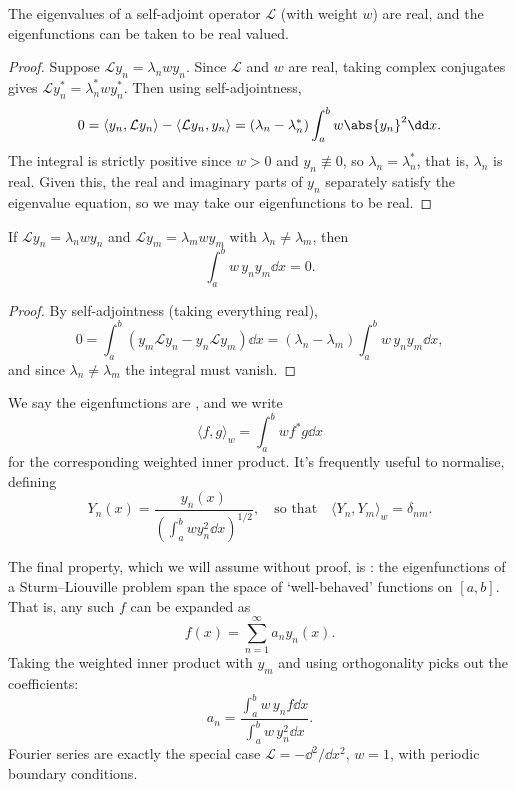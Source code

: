 \begin{proposition}
    The eigenvalues of a self-adjoint operator $\mathcal{L}$ (with weight $w$) are real, and the eigenfunctions can be taken to be real valued.
\end{proposition}
\begin{proof}
    Suppose $\mathcal{L} y_n = \lambda_n w y_n$. Since $\mathcal{L}$ and $w$ are real, taking complex conjugates gives $\mathcal{L} y_n^* = \lambda_n^* w y_n^*$.
    Then using self-adjointness,
    $$
    0 = \langle y_n , \mathcal{L} y_n \rangle - \langle \mathcal{L} y_n, y_n \rangle = (\lambda_n - \lambda_n^*)\int_a^b w \abs{y_n}^2 \dd x.
    $$
    The integral is strictly positive since $w > 0$ and $y_n \not\equiv 0$, so $\lambda_n = \lambda_n^*$, that is, $\lambda_n$ is real.
    Given this, the real and imaginary parts of $y_n$ separately satisfy the eigenvalue equation, so we may take our eigenfunctions to be real.
\end{proof}

\begin{proposition}
    If $\mathcal{L} y_n = \lambda_n w y_n$ and $\mathcal{L}y_m = \lambda_m w y_m$ with $\lambda_n \neq \lambda_m$, then
    $$
    \int_a^b w\, y_n y_m \dd x = 0.
    $$
\end{proposition}
\begin{proof}
    By self-adjointness (taking everything real),
    $$
    0 = \int_a^b \left(y_m \mathcal{L} y_n - y_n \mathcal{L}y_m\right) \dd x = (\lambda_n - \lambda_m) \int_a^b w \, y_n y_m \dd x,
    $$
    and since $\lambda_n \neq \lambda_m$ the integral must vanish.
\end{proof}

We say the eigenfunctions are , and we write
$$
\langle f, g \rangle_w = \int_a^b w f^* g \dd x
$$
for the corresponding weighted inner product. It's frequently useful to normalise, defining
$$
Y_n(x) = \frac{y_n(x)}{\left(\int_a^b w y_n^2 \dd x\right)^{1/2}}, \quad \text{so that} \quad \langle Y_n, Y_m \rangle_w = \delta_{nm}.
$$

The final property, which we will assume without proof, is : the eigenfunctions of a Sturm--Liouville problem span the space of `well-behaved' functions on $[a, b]$. That is, any such $f$ can be expanded as
$$
f(x) = \sum_{n = 1}^{\infty} a_n y_n(x).
$$
Taking the weighted inner product with $y_m$ and using orthogonality picks out the coefficients:
$$
a_n = \frac{\int_a^b w\, y_n f \dd x}{\int_a^b w \,y_n^2 \dd x}.
$$
Fourier series are exactly the special case $\mathcal{L} = -\dd^2/\dd x^2$, $w = 1$, with periodic boundary conditions.

